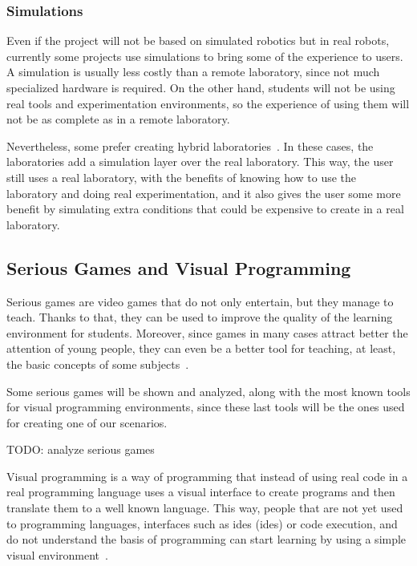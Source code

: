 \subsubsection{Simulations}

Even if the project will not be based on simulated robotics but in real robots, currently some
projects use simulations to bring some of the experience to users. A simulation is usually less
costly than a remote laboratory, since not much specialized hardware is required. On the other hand,
students will not be using real tools and experimentation environments, so the experience of using
them will not be as complete as in a remote laboratory.

Nevertheless, some prefer creating hybrid laboratories~\cite{hybrid_labs}. In these cases, the
laboratories add a simulation layer over the real laboratory. This way, the user still uses a real
laboratory, with the benefits of knowing how to use the laboratory and doing real experimentation,
and it also gives the user some more benefit by simulating extra conditions that could be expensive
to create in a real laboratory.

\subsection{Serious Games and Visual Programming}

Serious games are video games that do not only entertain, but they manage to teach. Thanks to that,
they can be used to improve the quality of the learning environment for students. Moreover, since
games in many cases attract better the attention of young people, they can even be a better tool for
teaching, at least, the basic concepts of some subjects~\cite{serious_games}.

Some serious games will be shown and analyzed, along with the most known tools for visual
programming environments, since these last tools will be the ones used for creating one of our
scenarios.

TODO: analyze serious games

Visual programming is a way of programming that instead of using real code in a real programming
language uses a visual interface to create programs and then translate them to a well known
language. This way, people that are not yet used to programming languages, interfaces such as
\acrshort{ide}s (\acrlong{ide}s) or code execution, and do not understand the basis of programming
can start learning by using a simple visual environment~\cite{visual_programming}.

